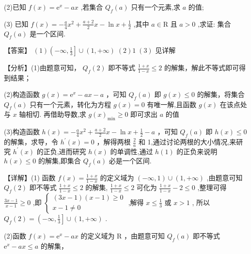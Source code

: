 \documentclass[10pt]{article}
\begin{document}
(2)已知 \(f\left( x\right)  = {\mathrm{e}}^{x} - {ax}\) ,若集合 \({Q}_{f}\left( a\right)\) 只有一个元素,求 \(a\) 的值;

(3) 已知 \(f\left( x\right)  =  - \frac{a}{4}{x}^{2} + \frac{a + 2}{2}x - \ln x + \frac{1}{2}\) ,其中 \(a \in  \mathrm{R}\) 且 \(a > 0\) ,求证: 集合 \({Q}_{f}\left( a\right)\) 是一个区间.

【答案】 \(\left( 1\right) \left( {-\infty ,\frac{1}{3}}\right\rbrack   \cup  \left( {1, + \infty }\right) \;\left( 2\right) 1\;\left( 3\right)\) 见详解

【分析】(1)由题意可知， \({Q}_{f}\left( 2\right)\) 即不等式 \(\frac{1 + x}{1 - x} \leq  2\) 的解集，解此不等式即可得到结果；

(2)构造函数 \(g\left( x\right)  = {\mathrm{e}}^{x} - {ax} - a\) ，可知 \({Q}_{f}\left( a\right)\) 即 \(g\left( x\right)  \leq  0\) 的解集，将集合 \({Q}_{f}\left( a\right)\) 只有一个元素，转化为方程 \(g\left( x\right)  = 0\) 有唯一解,且函数 \(g\left( x\right)\) 在该点处与 \(x\) 轴相切. 再借助导数,求 \(g{\left( x\right) }_{\min } \geq  0\) 即可求出 \(a\) 的值

(3)构造函数 \(h\left( x\right)  =  - \frac{a}{4}{x}^{2} + \frac{a + 2}{2}x - \ln x + \frac{1}{2} - a\) ，可知 \({Q}_{f}\left( a\right)\) 即 \(h\left( x\right)  \leq  0\) 的解集，求导，令 \({h}^{\prime }\left( x\right)  = 0\) ，解得两根 \(\frac{2}{a}\) 和 1,通过讨论两根的大小情况,来研究 \({h}^{\prime }\left( x\right)\) 的正负,进而研究 \(h\left( x\right)\) 的单调性,通过 \(h\left( 1\right)\) 的正负来说明 \(h\left( x\right)  \leq  0\) 的解集,即集合 \({Q}_{f}\left( a\right)\) 必是一个区间.

【详解】(1) 函数 \(f\left( x\right)  = \frac{1 + x}{1 - x}\) 的定义域为 \(\left( {-\infty ,1}\right)  \cup  \left( {1, + \infty }\right)\) ,由题意可知 \({Q}_{f}\left( 2\right)\) 即不等式 \(\frac{1 + x}{1 - x} \leq  2\) 的解集, \(\frac{1 + x}{1 - x} \leq  2\) 可化为 \(\frac{1 + x}{1 - x} - 2 \leq  0\) ,整理可得 \(\frac{{3x} - 1}{x - 1} \geq  0\) ,即 \(\left\{  \begin{array}{l} \left( {{3x} - 1}\right) \left( {x - 1}\right)  \geq  0 \\  x - 1 \neq  0 \end{array}\right.\) ,解得 \(x \leq  \frac{1}{3}\) 或 \(x > 1\) , 所以 \({Q}_{f}\left( 2\right)  = \left( {-\infty ,\frac{1}{3}}\right\rbrack   \cup  \left( {1, + \infty }\right)\) .

(2)函数 \(f\left( x\right)  = {\mathrm{e}}^{x} - {ax}\) 的定义域为 \(\mathrm{R}\) ，由题意可知 \({Q}_{f}\left( a\right)\) 即不等式 \({\mathrm{e}}^{x} - {ax} \leq  a\) 的解集，
\end{document}
